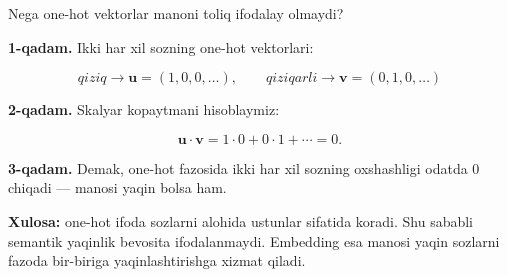 \documentclass[aspectratio=169,11pt]{beamer}
\begin{document}
\begin{frame}{Nega one-hot vektorlar ma\textquotesingle{}noni to\textquotesingle{}liq ifodalay olmaydi?}
\small

\textbf{1-qadam.} Ikki har xil so\textquotesingle{}zning one-hot vektorlari:

\[
\textit{qiziq}\rightarrow \mathbf{u}=(1,0,0,\ldots),
\qquad
\textit{qiziqarli}\rightarrow \mathbf{v}=(0,1,0,\ldots)
\]

\vspace{4pt}

\textbf{2-qadam.} Skalyar ko\textquotesingle{}paytmani hisoblaymiz:

\[
\mathbf{u}\cdot \mathbf{v}
=1\cdot0+0\cdot1+\cdots=0.
\]

\vspace{4pt}

\textbf{3-qadam.} Demak, one-hot fazosida ikki har xil so\textquotesingle{}zning
o\textquotesingle{}xshashligi odatda $0$ chiqadi — ma\textquotesingle{}nosi yaqin
bo\textquotesingle{}lsa ham.

\vspace{6pt}

\begin{tcolorbox}[defbox]
\footnotesize
\textbf{Xulosa:} one-hot ifoda so\textquotesingle{}zlarni alohida ustunlar sifatida
ko\textquotesingle{}radi. Shu sababli semantik yaqinlik bevosita ifodalanmaydi.
Embedding esa ma\textquotesingle{}nosi yaqin so\textquotesingle{}zlarni fazoda
bir-biriga yaqinlashtirishga xizmat qiladi.
\end{tcolorbox}

\end{frame}
\end{document}
